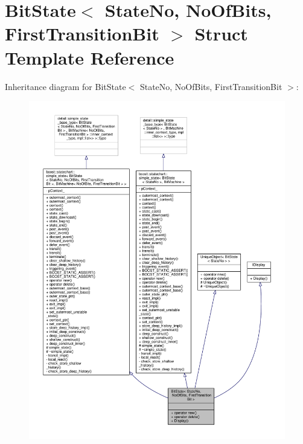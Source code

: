 \hypertarget{struct_bit_state}{}\section{Bit\+State$<$ State\+No, No\+Of\+Bits, First\+Transition\+Bit $>$ Struct Template Reference}
\label{struct_bit_state}


Inheritance diagram for Bit\+State$<$ State\+No, No\+Of\+Bits, First\+Transition\+Bit $>$\+:
\nopagebreak
\begin{figure}[H]
\begin{center}
\leavevmode
\includegraphics[width=350pt]{struct_bit_state__inherit__graph}
\end{center}
\end{figure}


